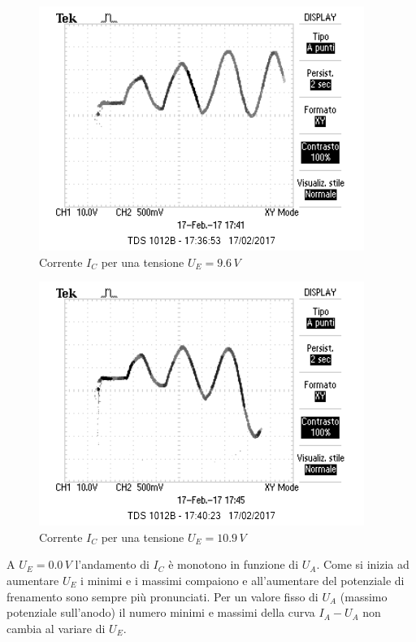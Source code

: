 \documentclass[10pt,a4paper]{article}
\begin{document}
\begin{figure}[!htb]
  \centering
  \includegraphics[scale=1.0]{ue9punto680volts.png}
\caption{Corrente $I_C$ per una tensione $U_E = 9.6 \, V$}
\label{grafico2}
\end{figure}


\begin{figure}[!htb]
  \centering
  \includegraphics[scale=1.0]{ue10punto970volts.png}
\caption{Corrente $I_C$ per una tensione $U_E = 10.9 \, V$}
\label{grafico3}
\end{figure}

A $U_E = 0.0 \, V$ l'andamento di $I_C$ è monotono in funzione di $U_A$. Come si inizia ad aumentare $U_E$ i minimi e i massimi compaiono e all'aumentare del potenziale di frenamento sono sempre più pronunciati. Per un valore fisso di $U_A$ (massimo potenziale sull'anodo) il numero minimi e massimi della curva $I_A-U_A$ non cambia al variare di $U_E$.\\
\end{document}
